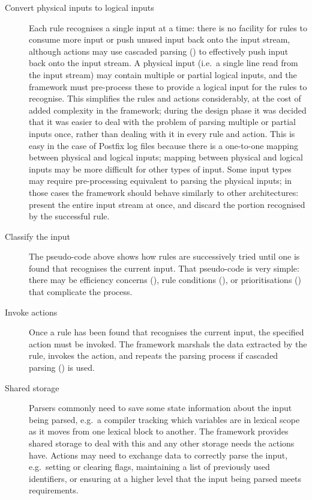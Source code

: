 \begin{description}
    \item [Convert physical inputs to logical inputs] Each rule recognises
        a single input at a time: there is no facility for rules to consume
        more input or push unused input back onto the input stream,
        although actions may use cascaded parsing () to effectively push input back onto the input stream.  A
        physical input (i.e.\ a single line read from the input stream) may
        contain multiple or partial logical inputs, and the framework must
        pre-process these to provide a logical input for the rules to
        recognise.  This simplifies the rules and actions considerably, at
        the cost of added complexity in the framework; during the design
        phase it was decided that it was easier to deal with the problem of
        parsing multiple or partial inputs once, rather than dealing with
        it in every rule and action.  This is easy in the case of Postfix
        log files because there is a one-to-one mapping between physical
        and logical inputs; mapping between physical and logical inputs may
        be more difficult for other types of input.  Some input types may
        require pre-processing equivalent to parsing the physical inputs;
        in those cases the framework should behave similarly to other
        architectures: present the entire input stream at once, and discard
        the portion recognised by the successful rule.

    \item [Classify the input]  The pseudo-code above shows how rules are
        successively tried until one is found that recognises the current
        input.  That pseudo-code is very simple: there may be efficiency
        concerns (), rule conditions
        (), or prioritisations
        () that complicate the process.

    \item [Invoke actions]  Once a rule has been found that recognises the
        current input, the specified action must be invoked.  The framework
        marshals the data extracted by the rule, invokes the action, and
        repeats the parsing process if cascaded parsing
        () is used.

    \item [Shared storage]  Parsers commonly need to save some state
        information about the input being parsed, e.g.\ a compiler tracking
        which variables are in lexical scope as it moves from one lexical
        block to another.  The framework provides shared storage to deal
        with this and any other storage needs the actions have.  Actions
        may need to exchange data to correctly parse the input, e.g.\
        setting or clearing flags, maintaining a list of previously used
        identifiers, or ensuring at a higher level that the input being
        parsed meets requirements.


\end{description}
